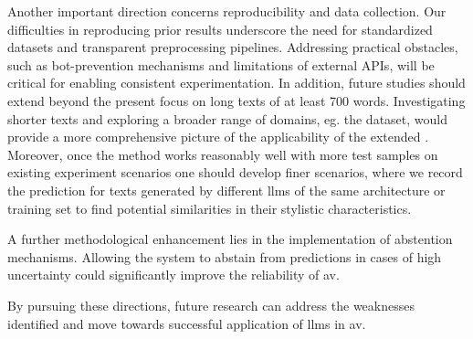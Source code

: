 Another important direction concerns reproducibility and data collection. 
Our difficulties in reproducing prior results underscore the need for standardized datasets and transparent preprocessing pipelines. 
Addressing practical obstacles, such as bot-prevention mechanisms and limitations of external APIs, will be critical for enabling consistent experimentation. 
In addition, future studies should extend beyond the present focus on long texts of at least 700 words. 
Investigating shorter texts and exploring a broader range of domains, eg. the \dataPan{} dataset, would provide a more comprehensive picture of the applicability of the extended \impAppr{}.
Moreover, once the method works reasonably well with more test samples on existing experiment scenarios one should develop finer scenarios, where we record the prediction for texts generated by different \acp{llm} of the same architecture or training set to find potential similarities in their stylistic characteristics.

A further methodological enhancement lies in the implementation of abstention mechanisms. 
Allowing the system to abstain from predictions in cases of high uncertainty could significantly improve the reliability of \ac{av}. 

By pursuing these directions, future research can address the weaknesses identified and move towards successful application of \acp{llm} in \ac{av}.




% 





